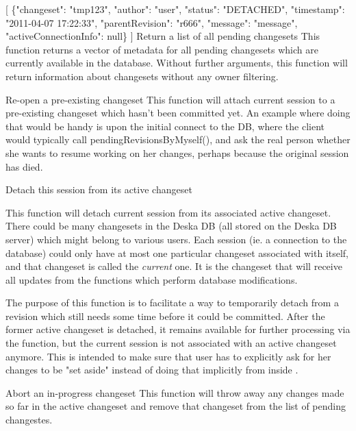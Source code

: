 \documentclass{article}
\begin{document}
    {[
     \{"changeset": "tmp123", "author": "user", "status": "DETACHED", "timestamp": "2011-04-07 17:22:33",
     "parentRevision": "r666", "message": "message", \\ "activeConnectionInfo": null\}
    ]}
    {Return a list of all pending changesets}
    {This function returns a vector of metadata for all pending changesets which are currently available in the
    database.  Without further arguments, this function will return information about changesets without any owner
    filtering.}

    {}
    {Re-open a pre-existing changeset}
    {This function will attach current session to a pre-existing changeset which hasn't been committed yet. An example
    where doing that would be handy is upon the initial connect to the DB, where the client would typically call
    pendingRevisionsByMyself(), and ask the real person whether she wants to resume working on her changes, perhaps
    because the original session has died.}

    {}
    {Detach this session from its active changeset}
    {This function will detach current session from its associated active changeset.  There could be many changesets in
    the Deska DB (all stored on the Deska DB server) which might belong to various users.  Each session (ie. a
    connection to the database) could only have at most one particular changeset associated with itself, and that
    changeset is called the {\em current} one.  It is the changeset that will receive all updates from the functions
    which perform database modifications.

    The purpose of this function is to facilitate a way to temporarily detach from a revision which still needs some
    time before it could be committed. After the former active changeset is detached, it remains available for further
    processing via the  function, but the current session is not associated with an active
    changeset anymore. This is intended to make sure that user has to explicitly ask for her changes to be "set aside"
    instead of doing that implicitly from inside .}

    {Abort an in-progress changeset}
    {This function will throw away any changes made so far in the active changeset and remove that changeset from the
    list of pending changestes.}
\end{document}
